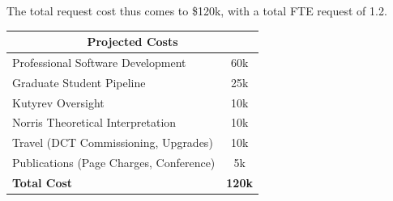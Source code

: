 \documentclass[letterpaper,11pt]{article}
\begin{document}
The total request cost thus comes to \$120k, with a total FTE request of 1.2.

\smallskip

\begin{center}
\begin{tabular}{lc}
\multicolumn{2}{c}{\textbf{Projected Costs}} \\
\hline
Professional Software Development & 60k \\
Graduate Student Pipeline & 25k \\
Kutyrev Oversight & 10k \\
Norris Theoretical Interpretation & 10k \\
Travel (DCT Commissioning, Upgrades) & 10k \\
Publications (Page Charges, Conference) & 5k \\
\hline
\textbf{Total Cost} & \textbf{120k} \\
\end{tabular}
\end{center}

\end{document}
